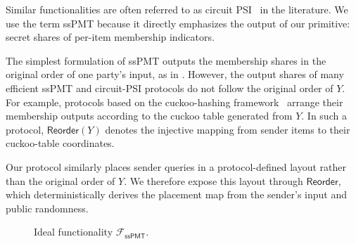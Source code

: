 \begin{remark}
    Similar functionalities are often referred to as circuit PSI~\cite{RR22,BPSY23} in the literature. We use the term ssPMT because it directly emphasizes the output of our primitive: secret shares of per-item membership indicators.
\end{remark}

The simplest formulation of ssPMT outputs the membership shares in the original order of one party's input, as in
. However, the output shares of many efficient ssPMT and circuit-PSI protocols do not follow the original order of $Y$. For example, protocols based on the cuckoo-hashing framework~\cite{PSTY19,RS21} arrange their membership outputs according to the cuckoo table generated from $Y$. In such a protocol, $\mathsf{Reorder}(Y)$ denotes the injective mapping from sender items to their cuckoo-table coordinates.

Our protocol similarly places sender queries in a protocol-defined layout rather than the original order of $Y$.
We therefore expose this layout through $\mathsf{Reorder}$, which deterministically derives the placement map from the sender's input and public randomness.

\begin{figure}[htbp]
\centering
{}
\caption{Ideal functionality $\mathcal{F}_{\mathsf{ssPMT}}$.}
\label{fig:F-sspmt}
\end{figure}

